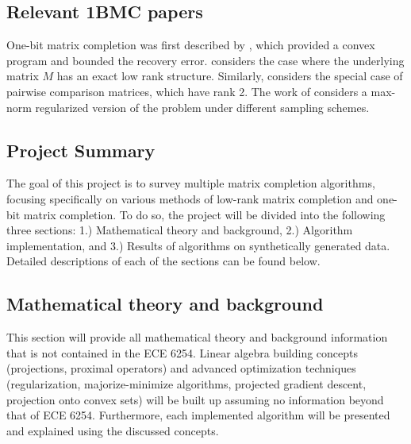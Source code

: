 \subsection{{Relevant 1BMC papers}} One-bit matrix completion was first described by \cite{davenport20141}, which provided a convex program and bounded the recovery error. \cite{7086879} considers the case where the underlying matrix $M$ has an exact low rank structure. Similarly, \cite{mm-spars-2013} considers the special case of pairwise comparison matrices, which have rank 2. The work of \cite{cai2013max} considers a max-norm regularized version of the problem under different sampling schemes. 

\subsection{{Project Summary}} The goal of this project is to survey multiple matrix completion algorithms, focusing specifically on various methods of low-rank matrix completion and one-bit matrix completion. To do so, the project will be divided into the following three sections: 1.) Mathematical theory and background, 2.) Algorithm implementation, and 3.) Results of algorithms on synthetically generated data. Detailed descriptions of each of the sections can be found below.

\subsection{{Mathematical theory and background}} This section will provide all mathematical theory and background information that is not contained in the ECE 6254. Linear algebra building concepts (projections, proximal operators) and advanced optimization techniques (regularization, majorize-minimize algorithms, projected gradient descent, projection onto convex sets) will be built up assuming no information beyond that of ECE 6254. Furthermore, each implemented algorithm will be presented and explained using the discussed concepts. 

